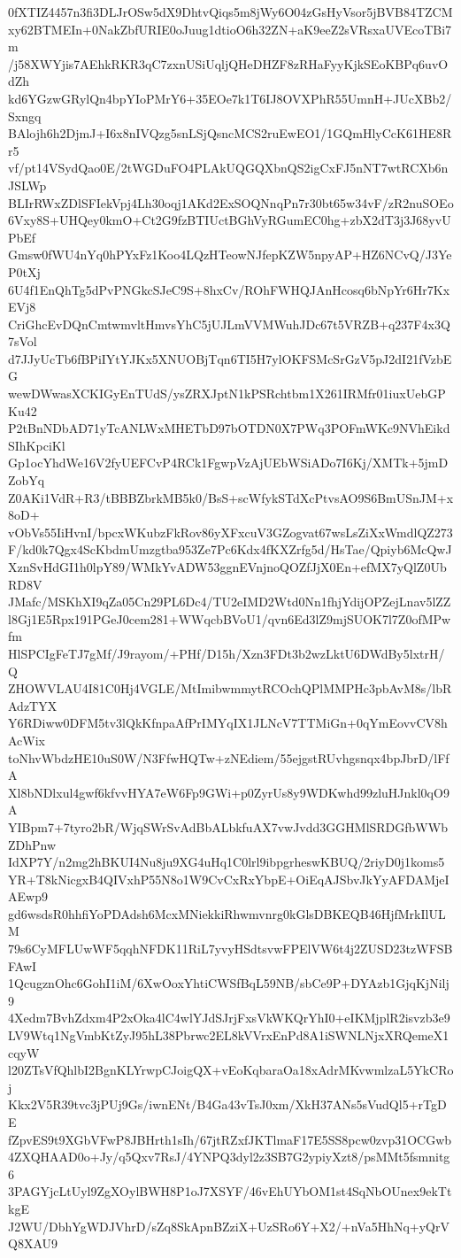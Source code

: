 0fXTIZ4457n3fi3DLJrOSw5dX9DhtvQiqs5m8jWy6O04zGsHyVsor5jBVB84TZCM
xy62BTMEIn+0NakZbfURIE0oJuug1dtioO6h32ZN+aK9eeZ2sVRsxaUVEcoTBi7m
/j58XWYjis7AEhkRKR3qC7zxnUSiUqljQHeDHZF8zRHaFyyKjkSEoKBPq6uvOdZh
kd6YGzwGRylQn4bpYIoPMrY6+35EOe7k1T6IJ8OVXPhR55UmnH+JUcXBb2/Sxngq
BAlojh6h2DjmJ+I6x8nIVQzg5snLSjQsncMCS2ruEwEO1/1GQmHlyCcK61HE8Rr5
vf/pt14VSydQao0E/2tWGDuFO4PLAkUQGQXbnQS2igCxFJ5nNT7wtRCXb6nJSLWp
BLIrRWxZDlSFIekVpj4Lh30oqj1AKd2ExSOQNnqPn7r30bt65w34vF/zR2nuSOEo
6Vxy8S+UHQey0kmO+Ct2G9fzBTIUctBGhVyRGumEC0hg+zbX2dT3j3J68yvUPbEf
Gmsw0fWU4nYq0hPYxFz1Koo4LQzHTeowNJfepKZW5npyAP+HZ6NCvQ/J3YeP0tXj
6U4f1EnQhTg5dPvPNGkcSJeC9S+8hxCv/ROhFWHQJAnHcosq6bNpYr6Hr7KxEVj8
CriGhcEvDQnCmtwmvltHmvsYhC5jUJLmVVMWuhJDc67t5VRZB+q237F4x3Q7sVol
d7JJyUcTb6fBPiIYtYJKx5XNUOBjTqn6TI5H7ylOKFSMcSrGzV5pJ2dI21fVzbEG
wewDWwasXCKIGyEnTUdS/ysZRXJptN1kPSRchtbm1X261IRMfr01iuxUebGPKu42
P2tBnNDbAD71yTcANLWxMHETbD97bOTDN0X7PWq3POFmWKc9NVhEikdSIhKpciKl
Gp1ocYhdWe16V2fyUEFCvP4RCk1FgwpVzAjUEbWSiADo7I6Kj/XMTk+5jmDZobYq
Z0AKi1VdR+R3/tBBBZbrkMB5k0/BsS+scWfykSTdXcPtvsAO9S6BmUSnJM+x8oD+
vObVs55IiHvnI/bpcxWKubzFkRov86yXFxcuV3GZogvat67wsLsZiXxWmdlQZ273
F/kd0k7Qgx4ScKbdmUmzgtba953Ze7Pc6Kdx4fKXZrfg5d/HsTae/Qpiyb6McQwJ
XznSvHdGI1h0lpY89/WMkYvADW53ggnEVnjnoQOZfJjX0En+efMX7yQlZ0UbRD8V
JMafc/MSKhXI9qZa05Cn29PL6Dc4/TU2eIMD2Wtd0Nn1fhjYdijOPZejLnav5lZZ
l8Gj1E5Rpx191PGeJ0cem281+WWqcbBVoU1/qvn6Ed3lZ9mjSUOK7l7Z0ofMPwfm
HlSPCIgFeTJ7gMf/J9rayom/+PHf/D15h/Xzn3FDt3b2wzLktU6DWdBy5lxtrH/Q
ZHOWVLAU4I81C0Hj4VGLE/MtImibwmmytRCOchQPlMMPHc3pbAvM8s/lbRAdzTYX
Y6RDiww0DFM5tv3lQkKfnpaAfPrIMYqIX1JLNcV7TTMiGn+0qYmEovvCV8hAcWix
toNhvWbdzHE10uS0W/N3FfwHQTw+zNEdiem/55ejgstRUvhgsnqx4bpJbrD/lFfA
Xl8bNDlxul4gwf6kfvvHYA7eW6Fp9GWi+p0ZyrUs8y9WDKwhd99zluHJnkl0qO9A
YIBpm7+7tyro2bR/WjqSWrSvAdBbALbkfuAX7vwJvdd3GGHMlSRDGfbWWbZDhPnw
IdXP7Y/n2mg2hBKUI4Nu8ju9XG4uHq1C0lrl9ibpgrheswKBUQ/2riyD0j1koms5
YR+T8kNicgxB4QIVxhP55N8o1W9CvCxRxYbpE+OiEqAJSbvJkYyAFDAMjeIAEwp9
gd6wsdsR0hhfiYoPDAdsh6McxMNiekkiRhwmvnrg0kGlsDBKEQB46HjfMrkIlULM
79s6CyMFLUwWF5qqhNFDK11RiL7yvyHSdtsvwFPElVW6t4j2ZUSD23tzWFSBFAwI
1QcugznOhc6GohI1iM/6XwOoxYhtiCWSfBqL59NB/sbCe9P+DYAzb1GjqKjNilj9
4Xedm7BvhZdxm4P2xOka4lC4wlYJdSJrjFxsVkWKQrYhI0+eIKMjplR2isvzb3e9
LV9Wtq1NgVmbKtZyJ95hL38Pbrwc2EL8kVVrxEnPd8A1iSWNLNjxXRQemeX1cqyW
l20ZTsVfQhlbI2BgnKLYrwpCJoigQX+vEoKqbaraOa18xAdrMKvwmlzaL5YkCRoj
Kkx2V5R39tvc3jPUj9Gs/iwnENt/B4Ga43vTsJ0xm/XkH37ANs5sVudQl5+rTgDE
fZpvES9t9XGbVFwP8JBHrth1sIh/67jtRZxfJKTlmaF17E5SS8pcw0zvp31OCGwb
4ZXQHAAD0o+Jy/q5Qxv7RsJ/4YNPQ3dyl2z3SB7G2ypiyXzt8/psMMt5fsmnitg6
3PAGYjcLtUyl9ZgXOylBWH8P1oJ7XSYF/46vEhUYbOM1st4SqNbOUnex9ekTtkgE
J2WU/DbhYgWDJVhrD/sZq8SkApnBZziX+UzSRo6Y+X2/+nVa5HhNq+yQrVQ8XAU9
